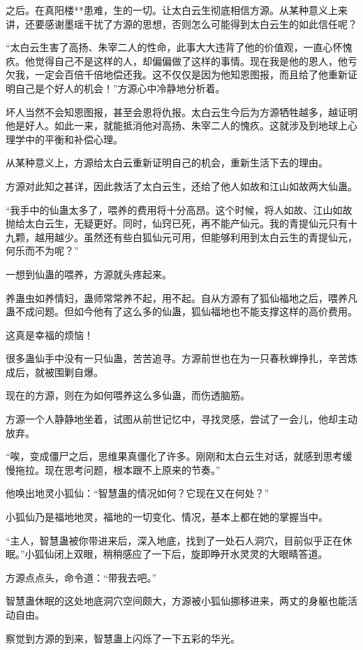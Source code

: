 \begin{this_body}
之后。在真阳楼**患难，生的一切。让太白云生彻底相信方源。从某种意义上来讲，还要感谢墨瑶干扰了方源的思想，否则怎么可能得到太白云生的如此信任呢？

“太白云生害了高扬、朱宰二人的性命，此事大大违背了他的价值观，一直心怀愧疚。他觉得自己不是这样的人，却偏偏做了这样的事情。现在我是他的恩人，他亏欠我，一定会百倍千倍地偿还我。这不仅仅是因为他知恩图报，而且给了他重新证明自己是个好人的机会！”方源心中冷静地分析着。

坏人当然不会知恩图报，甚至会恩将仇报。太白云生今后为方源牺牲越多，越证明他是好人。如此一来，就能抵消他对高扬、朱宰二人的愧疚。这就涉及到地球上心理学中的平衡和补偿心理。

从某种意义上，方源给太白云重新证明自己的机会，重新生活下去的理由。

方源对此知之甚详，因此救活了太白云生，还给了他人如故和江山如故两大仙蛊。

“我手中的仙蛊太多了，喂养的费用将十分高昂。这个时候，将人如故、江山如故抛给太白云生，无疑更好。同时，仙窍已死，再不能产仙元。我的青提仙元只有十九颗，越用越少。虽然还有些白狐仙元可用，但能够利用到太白云生的青提仙元，何乐而不为呢？”

一想到仙蛊的喂养，方源就头疼起来。

养蛊虫如养情妇，蛊师常常养不起，用不起。自从方源有了狐仙福地之后，喂养凡蛊不成问题。但如今他有了这么多的仙蛊，狐仙福地也不能支撑这样的高价费用。

这真是幸福的烦恼！

很多蛊仙手中没有一只仙蛊，苦苦追寻。方源前世也在为一只春秋蝉挣扎，辛苦炼成后，就被围剿自爆。

现在的方源，则在为如何喂养这么多仙蛊，而伤透脑筋。

方源一个人静静地坐着，试图从前世记忆中，寻找灵感，尝试了一会儿，他却主动放弃。

“唉，变成僵尸之后，思维果真僵化了许多。刚刚和太白云生对话，就感到思考缓慢拖拉。现在思考问题，根本跟不上原来的节奏。”

他唤出地灵小狐仙：“智慧蛊的情况如何？它现在又在何处？”

小狐仙乃是福地地灵，福地的一切变化、情况，基本上都在她的掌握当中。

“主人，智慧蛊被你带进来后，深入地底，找到了一处石人洞穴，目前似乎正在休眠。”小狐仙闭上双眼，稍稍感应了一下后，旋即睁开水灵灵的大眼睛答道。

方源点点头，命令道：“带我去吧。”

智慧蛊休眠的这处地底洞穴空间颇大，方源被小狐仙挪移进来，两丈的身躯也能活动自由。

察觉到方源的到来，智慧蛊上闪烁了一下五彩的华光。


\end{this_body}
